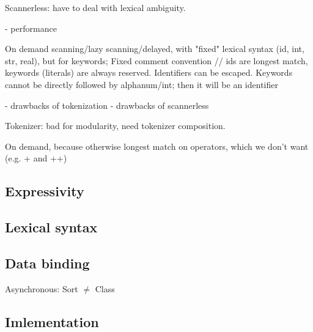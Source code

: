 Scannerless: have to deal with lexical ambiguity.
   
  
- performance 


On demand scanning/lazy scanning/delayed, with "fixed" lexical syntax
(id, int, str, real), but for keywords; Fixed comment convention //
ids are longest match, keywords (literals) are always
reserved. Identifiers can be escaped.  Keywords cannot be directly
followed by alphanum/int; then it will be an identifier

- drawbacks of tokenization
- drawbacks of scannerless

Tokenizer: bad for modularity, need tokenizer composition. 

On demand, because otherwise longest match on operators, which we don't want (e.g. + and ++)


\subsection{Expressivity}

\subsection{Lexical syntax}

\subsection{Data binding}

Asynchronous: Sort $\neq$ Class

\subsection{Imlementation}